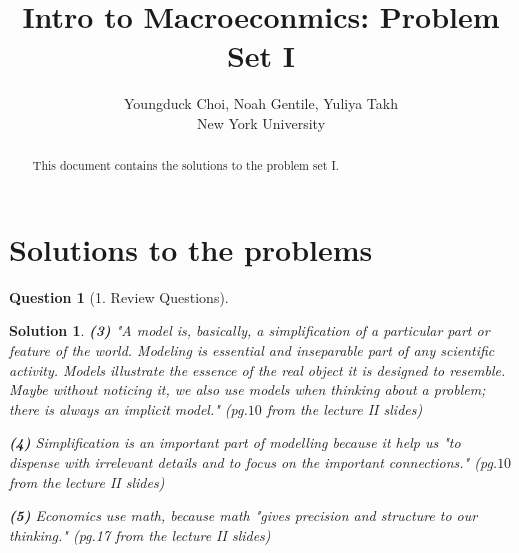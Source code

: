 \documentclass{article} %
\title{Intro to Macroeconmics: Problem Set I}
\author{
Youngduck Choi, Noah Gentile, Yuliya Takh \\
New York University \\
}
\theoremstyle{quest}
\newtheorem*{question}{Question}
\newtheorem*{solution}{Solution}
\begin{document}
\maketitle

\begin{abstract}
This document contains the solutions to the problem set I.
\end{abstract}

\section{Solutions to the problems}

\begin{question}[1. Review Questions]
\end{question}
\begin{solution}

\textbf{(3)}
"A model is, basically, a simplification of a particular part or feature of the world. 
Modeling is essential and inseparable part of any scientific activity. Models illustrate
the essence of the real object it is designed to resemble. Maybe without noticing it, we also
use models when thinking about a problem; there is always an implicit model." 
(pg.$10$ from the lecture II slides) 

\smallskip

\textbf{(4)}
Simplification is an important part of modelling because it help us
"to dispense with irrelevant details and to focus on the important connections." 
(pg.$10$ from the lecture II slides)
\smallskip

\textbf{(5)}
Economics use math, because math "gives precision and structure to our thinking." (pg.17 
from the lecture II slides)
\end{solution}

\bigskip
\end{document}
